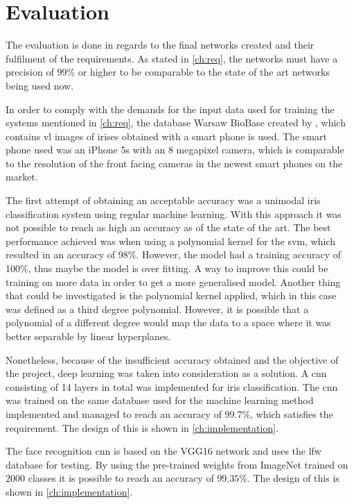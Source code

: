 \chapter{Evaluation}
The evaluation is done in regards to the final networks created and their fulfilment of the requirements. As stated in \autoref{ch:req}, the networks must have a precision of $99\%$ or higher to be comparable to the state of the art networks being used now.

In order to comply with the demands for the input data used for training the systems mentioned in \autoref{ch:req}, the database Warsaw BioBase created by \cite{Trokielewicz2016}, which contains \gls{vl} images of irises obtained with a smart phone is used. The smart phone used was an iPhone 5s with an 8 megapixel camera, which is comparable to the resolution of the front facing cameras in the newest smart phones on the market. 

The first attempt of obtaining an acceptable accuracy was a unimodal iris classification system using regular machine learning. With this approach it was not possible to reach as high an accuracy as of the state of the art. The best performance achieved was when using a polynomial kernel for the \gls{svm}, which resulted in an accuracy of 98\%. However, the model had a training accuracy of 100\%, thus maybe the model is over fitting. A way to improve this could be training on more data in order to get a more generalised model. Another thing that could be investigated is the polynomial kernel applied, which in this case was defined as a third degree polynomial. However, it is possible that a polynomial of a different degree would map the data to a space where it was better separable by linear hyperplanes. 

Nonetheless, because of the insufficient accuracy obtained and the objective of the project, deep learning was taken into consideration as a solution. A \gls{cnn} consisting of 14 layers in total was implemented for iris classification. The \gls{cnn} was trained on the same database used for the machine learning method implemented and managed to reach an accuracy of $99.7\%$, which satisfies the requirement. The design of this is shown in \autoref{ch:implementation}.

The face recognition \gls{cnn} is based on the VGG16 network and uses the \gls{lfw} database for testing. By using the pre-trained weights from ImageNet trained on 2000 classes it is possible to reach an accuracy of $99.35\%$. The design of this is shown in \autoref{ch:implementation}.	

